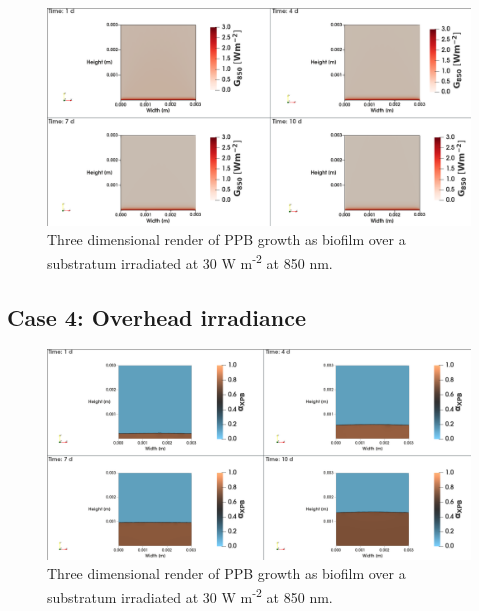 \begin{figure}[H]
    \centering
    \includegraphics[width=\textwidth,height=0.4\textheight]{Chap4/results/post_processing/2D_cases/case3_rad.png}
    \caption{Three dimensional render of PPB growth as biofilm over a substratum irradiated at 30 W m\textsuperscript{-2} at 850 nm. } 
    \label{fig:case5_3D_rad}
\end{figure}

\subsection{Case 4: Overhead irradiance}
\begin{figure}[H]
    \centering
    \includegraphics[width=\textwidth,height=0.4\textheight]{Chap4/results/post_processing/2D_cases/case4_ppb.png}
    \caption{Three dimensional render of PPB growth as biofilm over a substratum irradiated at 30 W m\textsuperscript{-2} at 850 nm. } 
    \label{fig:case5_3D_rad}
\end{figure}

